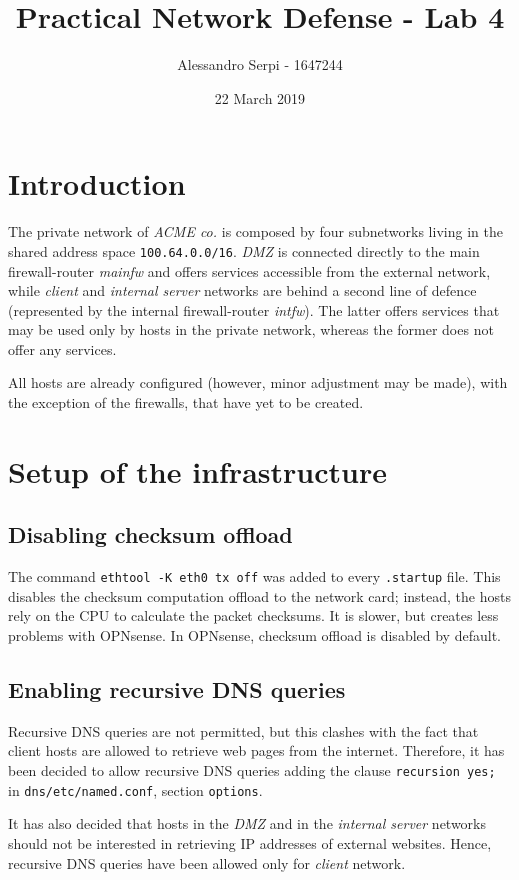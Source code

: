 \documentclass{homework}
\title{Practical Network Defense - Lab 4}
\author{Alessandro Serpi - 1647244}
\date{22 March 2019}
\newcommand{\opn}{OPNsense\xspace}
\newcommand{\client}{\textit{client}\xspace}
\newcommand{\dmz}{\textit{DMZ}\xspace}
\newcommand{\ser}{\textit{internal server}\xspace}
\newcommand{\intfw}{\textit{intfw}\xspace}
\newcommand{\mainfw}{\textit{mainfw}\xspace}
\begin{document}
    \maketitle
    \tableofcontents
    
    \medskip
    
    
    \section{Introduction}
    The private network of \textit{ACME co.} is composed by four subnetworks living in the shared address space \texttt{100.64.0.0/16}. \dmz is connected directly to the main firewall-router \mainfw and offers services accessible from the external network, while \client and \ser networks are behind a second line of defence (represented by the internal firewall-router \intfw). The latter offers services that may be used only by hosts in the private network, whereas the former does not offer any services.
    
    All hosts are already configured (however, minor adjustment may be made), with the exception of the firewalls, that have yet to be created. 
    
    
    \section{Setup of the infrastructure}
    \subsection{Disabling checksum offload}
    The command \texttt{ethtool -K eth0 tx off} was added to every \texttt{.startup} file. This disables the checksum computation offload to the network card; instead, the hosts rely on the CPU to calculate the packet checksums. It is slower, but creates less problems with \opn.
    In \opn, checksum offload is disabled by default.
    
    \subsection{Enabling recursive DNS queries}
    Recursive DNS queries are not permitted, but this clashes with the fact that client hosts are allowed to retrieve web pages from the internet. Therefore, it has been decided to allow recursive DNS queries adding the clause \texttt{recursion yes;} in \texttt{dns/etc/named.conf}, section \texttt{options}.
    
    It has also decided that hosts in the \dmz and in the \ser networks should not be interested in retrieving IP addresses of external websites. Hence, recursive DNS queries have been allowed only for \client network.
    
\end{document}
